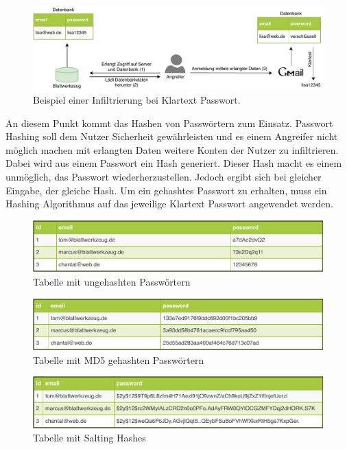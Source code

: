 \begin{figure}[h]
	\centering
	\includegraphics[width=\textwidth]{graphics/example-plaintext-password.pdf}
	\caption{Beispiel einer Infiltrierung bei Klartext Passwort.}
\end{figure}

An diesem Punkt kommt das Hashen von Passwörtern zum Einsatz. Passwort Hashing soll dem Nutzer Sicherheit gewährleisten und es einem Angreifer nicht möglich machen mit erlangten Daten weitere Konten der Nutzer zu infiltrieren. Dabei wird aus einem Passwort ein Hash generiert. Dieser Hash macht es einem unmöglich, das Passwort wiederherzustellen. Jedoch ergibt sich bei gleicher Eingabe, der gleiche Hash. Um ein gehashtes Passwort zu erhalten, muss ein Hashing Algorithmus auf das jeweilige Klartext Passwort angewendet werden.

\begin{figure}
	\includegraphics[width=\textwidth]{graphics/unhashed_table.pdf}
	\caption{Tabelle mit ungehashten Passwörtern}
	\label{fig:unhashed_table}
\end{figure}

\begin{figure}
	\includegraphics[width=\textwidth]{graphics/md5_table.pdf}
	\caption{Tabelle mit MD5 gehashten Passwörtern}
	\label{fig:md5_hashed_table}
\end{figure}

\begin{figure}
	\includegraphics[width=\textwidth]{graphics/salted_table.pdf}
	\caption{Tabelle mit Salting Hashes}
	\label{fig:salted_table}
\end{figure}


